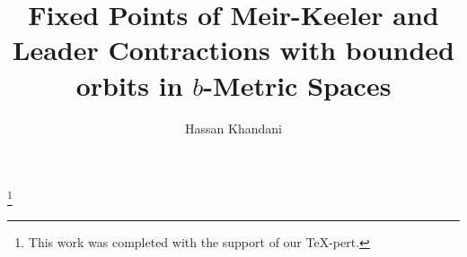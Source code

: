 \documentclass{birkjour}
\theoremstyle{definition}
\theoremstyle{remark}
\numberwithin{equation}{section}
\begin{document}
%
%
%
%
%
%
%
%
%


\title[Fixed Points of contractions]
 {Fixed Points of Meir-Keeler and Leader Contractions with bounded orbits in $b$-Metric Spaces}



\author[Hassan Khandani]{Hassan Khandani}

\address{%
Department of Mathematics \\
Mah. C, Islamic Azad University \\
Mahabad\\
Iran}


\thanks{This work was completed with the support of our
\TeX-pert.}

\end{document}
